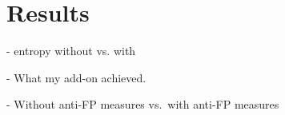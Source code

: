 \chapter{Results}

- entropy without vs. with

- What my add-on achieved.

- Without anti-FP measures vs.\ with anti-FP measures

